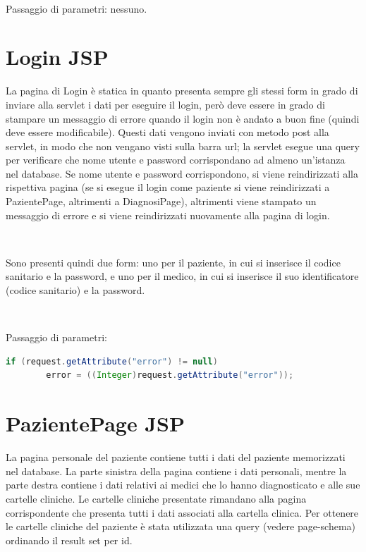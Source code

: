\documentclass[a4paper,titlepage]{article}
\begin{document}
~

Passaggio di parametri: nessuno.

\section{Login JSP}

La pagina di Login è statica in quanto presenta sempre gli stessi form in grado di inviare alla servlet i dati per eseguire il login, però deve essere in grado di stampare un messaggio di errore quando il login non è andato a buon fine (quindi deve essere modificabile). Questi dati vengono inviati con metodo post alla servlet, in modo che non vengano visti sulla barra url; la servlet esegue una query per verificare che nome utente e password corrispondano ad almeno un'istanza nel database. Se nome utente e password corrispondono, si viene reindirizzati alla rispettiva pagina (se si esegue il login come paziente si viene reindirizzati a PazientePage, altrimenti a DiagnosiPage), altrimenti viene stampato un messaggio di errore e si viene reindirizzati nuovamente alla pagina di login.

~

Sono presenti quindi due form: uno per il paziente, in cui si inserisce il codice sanitario e la password, e uno per il medico, in cui si inserisce il suo identificatore (codice sanitario) e la password.


~

Passaggio di parametri: 

\begin{lstlisting}[language=java]
	 if (request.getAttribute("error") != null)
 		error = ((Integer)request.getAttribute("error"));
\end{lstlisting}

\section{PazientePage JSP}

La pagina personale del paziente contiene tutti i dati del paziente memorizzati nel database. La parte sinistra della pagina contiene i dati personali, mentre la parte destra contiene i dati relativi ai medici che lo hanno diagnosticato e alle sue cartelle cliniche. Le cartelle cliniche presentate rimandano alla pagina corrispondente che presenta tutti i dati associati alla cartella clinica. Per ottenere le cartelle cliniche del paziente è stata utilizzata una query (vedere page-schema) ordinando il result set per id.
\end{document}
